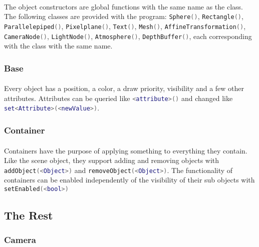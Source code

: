 \paragraph{}
The object constructors are global functions with the same name as the class.
The following classes are provided with the program:
\lstinline[language=lua]{Sphere()}, \lstinline[language=lua]{Rectangle()}, \lstinline[language=lua]{Parallelepiped()}, \lstinline[language=lua]{Pixelplane()}, \lstinline[language=lua]{Text()}, \lstinline[language=lua]{Mesh()}, \lstinline[language=lua]{AffineTransformation()}, \lstinline[language=lua]{CameraNode()}, \lstinline[language=lua]{LightNode()}, \lstinline[language=lua]{Atmosphere()}, \lstinline[language=lua]{DepthBuffer()}, each corresponding with the class with the same name.

\subsubsection{Base}
\paragraph{}
Every object has a position, a color, a draw priority, visibility and a few other attributes.
Attributes can be queried like \lstinline[language=lua]{<attribute>()} and changed like \lstinline[language=lua]{set<Attribute>(<newValue>)}.

\subsubsection{Container}
\paragraph{}
Containers have the purpose of applying something to everything they contain.
Like the scene object, they support adding and removing objects with \lstinline[language=lua]{addObject(<Object>)} and \lstinline[language=lua]{removeObject(<Object>)}.
The functionality of containers can be enabled independently of the visibility of their sub objects with \lstinline[language=lua]{setEnabled(<bool>)}

\subsection{The Rest}
\subsubsection{Camera}
